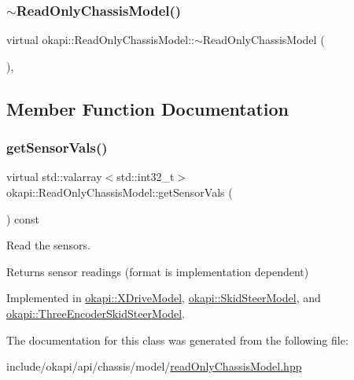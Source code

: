 \subsubsection{\texorpdfstring{$\sim$ReadOnlyChassisModel()}{~ReadOnlyChassisModel()}}
{\footnotesize\ttfamily virtual okapi\+::\+Read\+Only\+Chassis\+Model\+::$\sim$\+Read\+Only\+Chassis\+Model (\begin{DoxyParamCaption}{ }\end{DoxyParamCaption})\hspace{0.3cm}{\ttfamily [virtual]}, {\ttfamily [default]}}



\subsection{Member Function Documentation}
\mbox{\label{classokapi_1_1ReadOnlyChassisModel_af2d844d9e12bb7c778ac9a5a0074f848}} 
\subsubsection{\texorpdfstring{getSensorVals()}{getSensorVals()}}
{\footnotesize\ttfamily virtual std\+::valarray$<$std\+::int32\+\_\+t$>$ okapi\+::\+Read\+Only\+Chassis\+Model\+::get\+Sensor\+Vals (\begin{DoxyParamCaption}{ }\end{DoxyParamCaption}) const\hspace{0.3cm}{\ttfamily [pure virtual]}}

Read the sensors.

\begin{DoxyReturn}{Returns}
sensor readings (format is implementation dependent) 
\end{DoxyReturn}


Implemented in \mbox{\hyperlink{classokapi_1_1XDriveModel_a3beef170f1e7fd988d815f335cafad1e}{okapi\+::\+X\+Drive\+Model}}, \mbox{\hyperlink{classokapi_1_1SkidSteerModel_a850e4de7ab3a30a354ac39f30a1e8603}{okapi\+::\+Skid\+Steer\+Model}}, and \mbox{\hyperlink{classokapi_1_1ThreeEncoderSkidSteerModel_a39af35aa25e5385584b3834911aed341}{okapi\+::\+Three\+Encoder\+Skid\+Steer\+Model}}.



The documentation for this class was generated from the following file\+:\begin{DoxyCompactItemize}
\item 
include/okapi/api/chassis/model/\mbox{\hyperlink{readOnlyChassisModel_8hpp}{read\+Only\+Chassis\+Model.\+hpp}}\end{DoxyCompactItemize}
